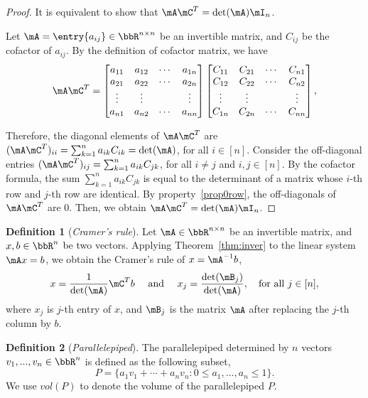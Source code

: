 \documentclass[11pt]{article}
\theoremstyle{plain}
\theoremstyle{definition}
\newtheorem{defn}{Definition}
\begin{document}
\begin{proof}
	It is equivalent to  show that $\mA \mC^T = \det(\mA) \mI_n$. 
	
	Let $\mA = \entry{a_{ij}} \in \bbR^{n \times n}$ be an invertible matrix, and $C_{ij}$ be the cofactor of $a_{ij}$. By the definition of cofactor matrix, we have
	\begin{align}
		\mA  \mC^T = \begin{bmatrix}
			a_{11} & a_{12} &\cdots &a_{1n}\\
			a_{21} & a_{22} &\cdots &a_{2n}\\
			\vdots & \vdots & & \vdots\\
			a_{n1} & a_{n2} &\cdots &a_{nn}\\
		\end{bmatrix} \begin{bmatrix}
			C_{11} & C_{21} &\cdots &C_{n1}\\
			C_{12} & C_{22} &\cdots &C_{n2}\\
			\vdots & \vdots & & \vdots\\
			C_{1n} & C_{2n} &\cdots &C_{nn}\\
		\end{bmatrix},
	\end{align}
	
	Therefore, the diagonal elements of $\mA \mC^T$ are $(\mA \mC^T)_{ii} = \sum_{k=1}^n a_{ik} C_{ik} = \det(\mA)$, for all $ i \in [n]$. Consider the off-diagonal entries $(\mA \mC^T)_{ij} = \sum_{k =1}^n a_{ik} C_{jk}$, for all  $i \neq j$ and $i, j \in [n]$. By the cofactor formula, the sum   $ \sum_{k =1}^n a_{ik} C_{jk}$ is equal to the determinant of a matrix whose $i$-th row and $j$-th row are identical. By property~\ref{prop0row}, the off-diagonals of $\mA \mC^T$ are 0. Then, we obtain $\mA \mC^T = \det(\mA) \mI_n$.
\end{proof}

\begin{defn}[\textit{Cramer's rule}]
Let  $\mA\in\bbR^{n \times n}$  be  an invertible matrix, and $ x, b \in \bbR^n$ be two vectors. Applying Theorem~\ref{thm:inver} to the linear system $\mA x=b$, we obtain the Cramer's rule of $x = \mA^{-1} b$, 
\[  x = \frac{1}{\det(\mA)} \mC^T b\quad \text{ and } \quad x_j = \frac{\det(\mB_j)}{\det(\mA)}, \quad \text{for all }j \in [n], \] 
	where $x_j$ is $j$-th entry of $x$, and $\mB_j$ is the matrix $\mA$ after replacing the $j$-th column by $b$.
\end{defn}

\begin{defn}[\textit{Parallelepiped}]
	The parallelepiped determined by $n$ vectors $v_1,...,v_n \in \bbR^n$ is defined as the following subset,
	\[ P = \{ a_1 v_1 + \cdots + a_n v_n \colon 0 \leq a_1,...,a_n \leq 1 \}. \]
	 We use $vol(P)$ to denote the volume of the parallelepiped  $P$. 
\end{defn}
\end{document}
